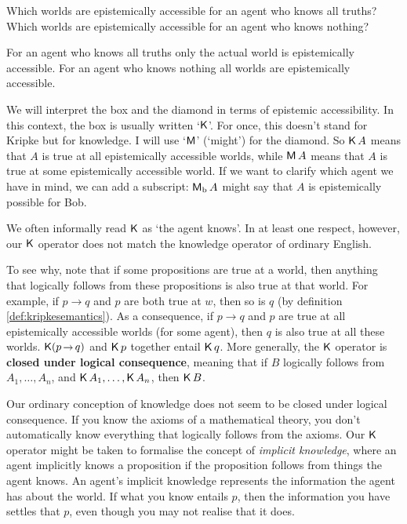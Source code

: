 \begin{exercise}
  Which worlds are epistemically accessible for an agent who knows all truths?
  Which worlds are epistemically accessible for an agent who knows nothing?
\end{exercise}
\begin{solution}
  For an agent who knows all truths only the actual world is epistemically accessible. For an agent who knows nothing all worlds are epistemically accessible.
\end{solution}

We will interpret the box and the diamond in terms of epistemic accessibility.
In this context, the box is usually written `$\operatorname{\mathsf{K}{}}$'. For once, this doesn't
stand for Kripke but for knowledge. I will use `$\operatorname{\mathsf{M}}$' (`might') for the
diamond. So $\operatorname{\mathsf{K}{}} A$ means that $A$ is true at all epistemically accessible
worlds, while $\operatorname{\mathsf{M}} A$ means that $A$ is true at some epistemically accessible
world. If we want to clarify which agent we have in mind, we can add a
subscript: $\operatorname{\mathsf{M}}_{\text{b}} A$ might say that $A$ is epistemically possible for
Bob.

We often informally read $\operatorname{\mathsf{K}{}}$ as `the agent knows'. In at least one respect,
however, our $\operatorname{\mathsf{K}{}}$ operator does not match the knowledge operator of ordinary
English.

To see why, note that if some propositions are true at a world, then anything
that logically follows from these propositions is also true at that world. For
example, if $p\to q$ and $p$ are both true at $w$, then so is $q$ (by definition
\ref{def:kripkesemantics}). As a consequence, if $p \to q$ and $p$ are true at
all epistemically accessible worlds (for some agent), then $q$ is also true at
all these worlds. $\Kn (p\to q)$ and $\operatorname{\mathsf{K}{}} p$ together entail $\operatorname{\mathsf{K}{}} q$. More
generally, the $\operatorname{\mathsf{K}{}}$ operator is \textbf{closed under logical consequence},
meaning that if $B$ logically follows from $A_1,\ldots,A_n$, and
$\operatorname{\mathsf{K}{}} A_1, \ldots,\operatorname{\mathsf{K}{}} A_n$, then $\operatorname{\mathsf{K}{}} B$.

Our ordinary conception of knowledge does not seem to be closed under logical
consequence. If you know the axioms of a mathematical theory, you don't
automatically know everything that logically follows from the axioms. Our $\operatorname{\mathsf{K}{}}$
operator might be taken to formalise the concept of \emph{implicit knowledge},
where an agent implicitly knows a proposition if the proposition follows from
things the agent knows. An agent's implicit knowledge represents the information
the agent has about the world. If what you know entails $p$, then the
information you have settles that $p$, even though you may not realise that it
does.

